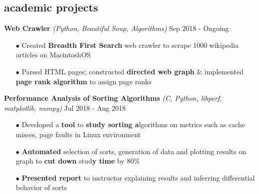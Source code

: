 \documentclass[a4paper, 10pt, oneside]{article}
\newcommand{\bulltetspace}{\vspace{-0.2em}}
\begin{document}
\begin{center}
\vspace{-0.3em}

\section{\color{headings}academic projects}
\vspace{-0.5em}



\color{headings}\textbf{Web Crawler} \textit{(Python, Beautiful Soup, Algorithms)} \hfill Sep 2018 - Ongoing
\color{text1}
\vspace{-0.3em}
\begin{itemize}
\bulltetspace
\item[$\bullet$] Created \textbf{Breadth First Search} web crawler to scrape 1000 wikipedia articles on MacintoshOS\\
\bulltetspace
\item[$\bullet$] Parsed HTML pages; constructed \textbf{directed web graph} \& implemented \textbf{page rank algorithm} to assign page ranks
\vspace{0.0em}
\end{itemize}


 \color{headings}\textbf{Performance Analysis of Sorting Algorithms} \textit{(C, Python, libperf, matplotlib, numpy)}  \hfill Jul 2018 - Aug 2018
\color{text1}
\vspace{-0.3em}
\begin{itemize}
\bulltetspace
\item[$\bullet$] Developed a  \textbf{tool} to  \textbf{study sorting a}lgorithms on metrics such as cache misses, page faults in Linux environment\\
\bulltetspace
\item[$\bullet$] \textbf{Automated} selection of sorts, generation of data and plotting results on graph to  \textbf{cut down} stud\textbf{y time} by 80\% \\
\bulltetspace
\item[$\bullet$]  \textbf{Presented report} to instructor explaining results and inferring differential behavior of sorts
\vspace{0.0em}
\end{itemize}


\end{center}
\end{document}
